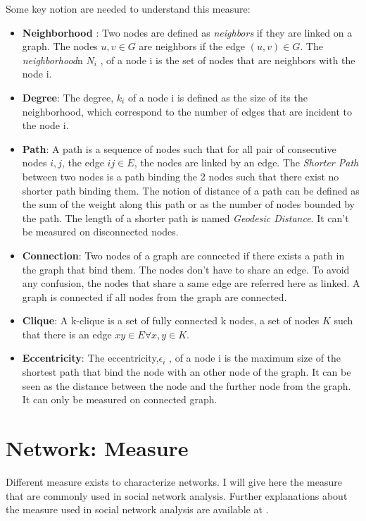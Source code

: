 \documentclass[a4paper, 12pt]{report}
\begin{document}
Some key notion are needed to understand this measure:
\begin{itemize}
\item \textbf{Neighborhood} : Two nodes are defined as \textit{neighbors} if they are linked on a graph. The nodes $u,v \in G$ are neighbors if the edge $(u,v) \in G$. The \textit{neighborhood}n $N_i$ , of a node i is the set of nodes that are neighbors with the node i.

\item \textbf{Degree}: The degree, $k_i$ of a node i is defined as the size of its the neighborhood, which correspond to the number of edges that are incident to the node i.


\item \textbf{Path}: A path is a sequence of nodes such that for all pair of consecutive nodes $i,j$, the edge $ij \in E$, the nodes are linked by an edge. The \textit{Shorter Path} between two nodes is a path binding the 2 nodes such that there exist no shorter path binding them. The notion of distance of a path can be defined as the sum of the weight along this path or as the number of nodes bounded by the path. The length of a shorter path is named \textit{Geodesic Distance}. It can't be measured on disconnected nodes.

\item \textbf{Connection}: Two nodes of a graph are connected if there exists a path in the graph that bind them. The nodes don't have to share an edge. To avoid any confusion, the nodes that share a same edge are referred here as linked. A graph is connected if all nodes from the graph are connected.

\item \textbf{Clique}: A k-clique is a set of fully connected k nodes, a set of nodes $K$ such that there is an edge $xy \in E \forall x,y \in K $. 

\item \textbf{Eccentricity}:  The eccentricity,$\epsilon_i$ , of a node i is the maximum size of the shortest path that bind the node with an other node of the graph. It can be seen as the distance between the node and the further node from the graph. It  can only be measured on connected graph.

\end{itemize}	
\citep{diestel}
\section{Network: Measure}
\label{measure}
Different measure exists to characterize networks. I will give here the measure that are commonly used in social network analysis. Further explanations about the measure used in social network analysis are available at \cite{SNA_Overview}.
\end{document}
